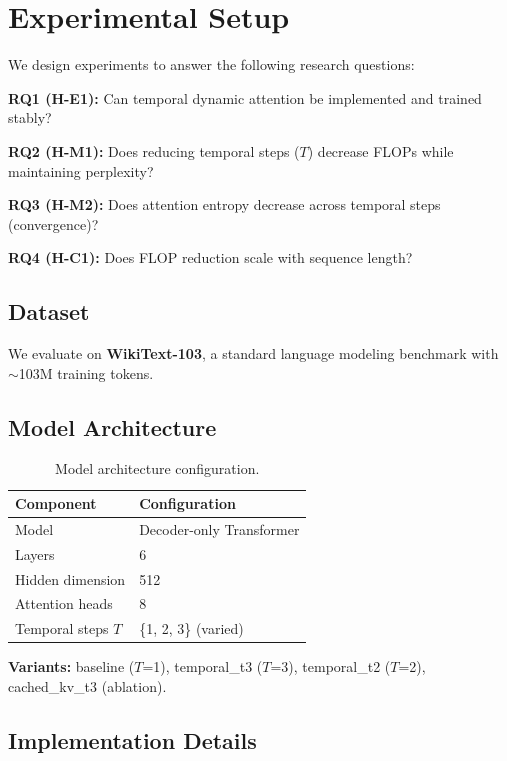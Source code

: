 \section{Experimental Setup}
\label{sec:experiments}

We design experiments to answer the following research questions:

\textbf{RQ1 (H-E1):} Can temporal dynamic attention be implemented and trained stably?

\textbf{RQ2 (H-M1):} Does reducing temporal steps ($T$) decrease FLOPs while maintaining perplexity?

\textbf{RQ3 (H-M2):} Does attention entropy decrease across temporal steps (convergence)?

\textbf{RQ4 (H-C1):} Does FLOP reduction scale with sequence length?

\subsection{Dataset}

We evaluate on \textbf{WikiText-103}, a standard language modeling benchmark with $\sim$103M training tokens.

\subsection{Model Architecture}

\begin{table}[h]
\centering
\begin{tabular}{@{}ll@{}}
\toprule
\textbf{Component} & \textbf{Configuration} \\
\midrule
Model & Decoder-only Transformer \\
Layers & 6 \\
Hidden dimension & 512 \\
Attention heads & 8 \\
Temporal steps $T$ & \{1, 2, 3\} (varied) \\
\bottomrule
\end{tabular}
\caption{Model architecture configuration.}
\label{tab:architecture}
\end{table}

\textbf{Variants:} baseline ($T$=1), temporal\_t3 ($T$=3), temporal\_t2 ($T$=2), cached\_kv\_t3 (ablation).

\subsection{Implementation Details}

